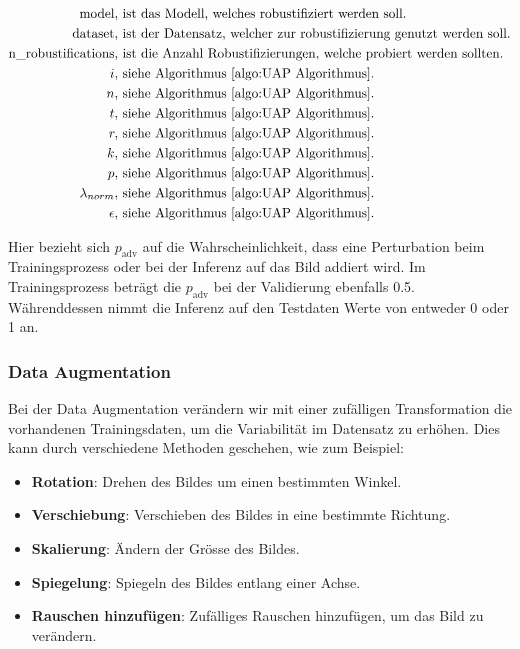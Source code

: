 \begin{align*}
\text{model}, &\text{ ist das Modell, welches robustifiziert werden soll.} \\
\text{dataset}, &\text{ ist der Datensatz, welcher zur robustifizierung genutzt werden soll.} \\
\text{n\_robustifications}, &\text{ ist die Anzahl Robustifizierungen, welche probiert werden sollten.} \\
i, &\text{ siehe Algorithmus \ref{algo:UAP Algorithmus}.}\\
n, &\text{ siehe Algorithmus \ref{algo:UAP Algorithmus}.}\\
t, &\text{ siehe Algorithmus \ref{algo:UAP Algorithmus}.}\\
r, &\text{ siehe Algorithmus \ref{algo:UAP Algorithmus}.}\\
k, &\text{ siehe Algorithmus \ref{algo:UAP Algorithmus}.}\\
p, &\text{ siehe Algorithmus \ref{algo:UAP Algorithmus}.}\\
\lambda_{norm}, &\text{ siehe Algorithmus \ref{algo:UAP Algorithmus}.}\\
\epsilon, &\text{ siehe Algorithmus \ref{algo:UAP Algorithmus}.}\\
\end{align*}

Hier bezieht sich $p_{\text{adv}}$ auf die Wahrscheinlichkeit, dass eine Perturbation beim Trainingsprozess oder bei der Inferenz auf das Bild addiert wird. Im Trainingsprozess beträgt die $p_{\text{adv}}$ bei der Validierung ebenfalls 0.5. Währenddessen nimmt die Inferenz auf den Testdaten Werte von entweder 0 oder 1 an. 


\subsubsection{Data Augmentation}

Bei der Data Augmentation verändern wir mit einer zufälligen Transformation die vorhandenen Trainingsdaten, um die Variabilität im Datensatz zu erhöhen. Dies kann durch verschiedene Methoden geschehen, wie zum Beispiel:

\begin{itemize}
    \item \textbf{Rotation}: Drehen des Bildes um einen bestimmten Winkel.
    \item \textbf{Verschiebung}: Verschieben des Bildes in eine bestimmte Richtung.
    \item \textbf{Skalierung}: Ändern der Grösse des Bildes.
    \item \textbf{Spiegelung}: Spiegeln des Bildes entlang einer Achse.
    \item \textbf{Rauschen hinzufügen}: Zufälliges Rauschen hinzufügen, um das Bild zu verändern.
\end{itemize}

